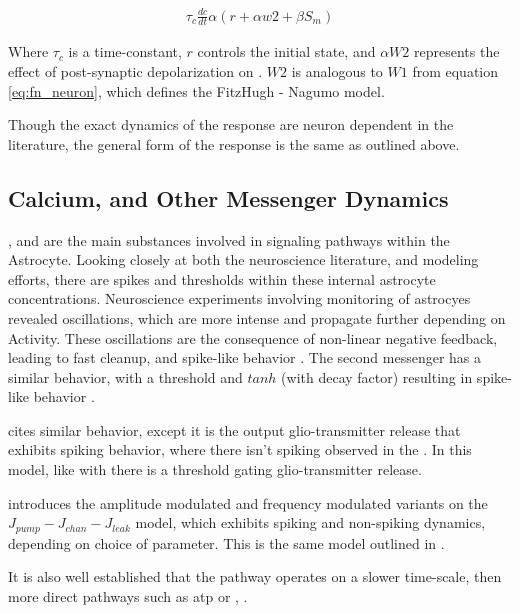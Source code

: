     \begin{align}
      \tau_c \frac{dc}{dt} \alpha (r + \alpha w2 + \beta S_m) \label{eq:kp_path_fn}
    \end{align}

    Where $\tau_c$ is a time-constant, $r$ controls the initial state, and
    $\alpha W2$ represents the effect of post-synaptic depolarization on
    \ca. $W2$ is analogous to $W1$ from equation \ref{eq:fn_neuron}, which
    defines the FitzHugh - Nagumo model.

    Though the exact dynamics of the response are neuron dependent in the
    literature, the general form of the response is the same as outlined above.
    
    \subsection{Calcium, and Other Messenger Dynamics}
    \ca, \ipt and \kp are the main substances involved in signaling pathways
    within the Astrocyte. Looking closely at both the neuroscience literature,
    and modeling efforts, there are spikes and thresholds within these internal
    astrocyte concentrations. Neuroscience experiments involving monitoring of
    astrocyes revealed oscillations, which are more intense and propagate
    further depending on Activity. These oscillations are the consequence of
    non-linear negative feedback, leading to fast cleanup, and spike-like
    behavior \parencite{postnov_2009}. The second messenger \ipt has a similar
    behavior, with a threshold and $tanh$ (with decay factor) resulting in
    spike-like behavior \parencite{postnov_2009}.

    \parencite{wade_2011} cites similar behavior, except it is the output
    glio-transmitter release that exhibits spiking behavior, where there isn't
    spiking observed in the \ca. In this model, like with
    \parencite{postnov_2009} there is a threshold gating glio-transmitter release.

    \parencite{pitta_2009} introduces the amplitude modulated and frequency
    modulated variants on the $J_{pump} - J_{chan} - J_{leak}$ model, which
    exhibits spiking and non-spiking \ca dynamics, depending on choice of
    parameter. This is the same model outlined in \parencite{wade_2011}.

    It is also well established that the \ipt pathway operates on a slower
    time-scale, then more direct pathways such as \Gls{atp} or \kp
    \parencite{postnov_2009}, \parencite{bassam_2015}.

